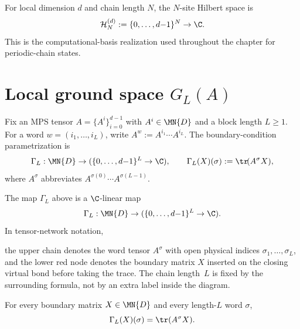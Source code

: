\begin{definition}\label{def:nsite_space_parent}
    \leanok
    For local dimension $d$ and chain length $N$, the $N$-site Hilbert space is
    \[
        \mathcal H_{N}^{(d)} := \{0,\ldots,d{-}1\}^{N} \to \C.
    \]
    This is the computational-basis realization used throughout the chapter for
    periodic-chain states.
\end{definition}

\section{\texorpdfstring{Local ground space $G_L(A)$}{Local ground space G\_L(A)}}\label{sec:ground_space_parent}

Fix an MPS tensor $A = \{A^i\}_{i=0}^{d-1}$ with $A^i \in \MN{D}$ and a block
length $L \ge 1$.
For a word $w = (i_1,\ldots,i_L)$, write
$A^w := A^{i_1}\cdots A^{i_L}$.
The boundary-condition parametrization is
\[
    \Gamma_L : \MN{D} \to (\{0,\ldots,d{-}1\}^L \to \C),
    \qquad
    \Gamma_L(X)(\sigma) := \tr\!(A^{\sigma} X),
\]
where $A^{\sigma}$ abbreviates
$A^{\sigma(0)}\cdots A^{\sigma(L-1)}$.

\begin{definition}\label{def:ground_space_map}
    \leanok
    The map $\Gamma_L$ above is a $\C$-linear map
    \[
        \Gamma_L : \MN{D} \to (\{0,\ldots,d{-}1\}^L \to \C).
    \]
    In tensor-network notation,
    \begin{center}
    \end{center}
    the upper chain denotes the word tensor $A^\sigma$ with open physical
    indices $\sigma_1,\ldots,\sigma_L$, and the lower red node denotes the boundary
    matrix $X$ inserted on the closing virtual bond before taking the trace.
    The chain length~$L$ is fixed by the surrounding formula, not by an extra
    label inside the diagram.
\end{definition}

\begin{lemma}\label{lem:ground_space_map_apply}
    \leanok
    For every boundary matrix $X \in \MN{D}$ and every length-$L$ word $\sigma$,
    \[
        \Gamma_{L}(X)(\sigma) = \tr(A^{\sigma} X).
    \]
\end{lemma}

